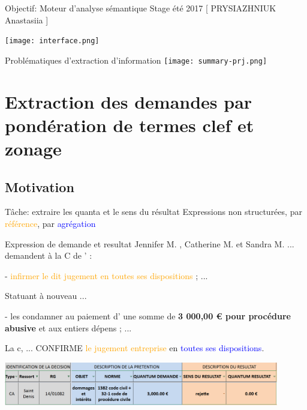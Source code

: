 \documentclass[newPxFont,pagenumber]{beamer}
\begin{document}
\begin{frame}{Objectif: Moteur d'analyse sémantique}
Stage été 2017 [ PRYSIAZHNIUK Anastasiia ]
\begin{center}
\texttt{[image: interface.png]}
\end{center}
\end{frame}


\begin{frame}{Problématiques d'extraction d'information}
\centering\texttt{[image: summary-prj.png]}
\end{frame}


\section{Extraction des demandes par pondération de termes clef et zonage}
\subsection{Motivation}
\begin{frame}{T\^ache: extraire les quanta et le sens du résultat}
\scriptsize
Expressions non structurées, par  \textcolor{orange}{référence}, par \textcolor{blue}{agrégation}
\begin{exampleblock}{Expression de demande et resultat}
\scriptsize
Jennifer M. , Catherine M. et Sandra M. ... demandent à la C de ' :

- \textcolor{orange}{infirmer le dit jugement en toutes ses dispositions} ; ...

Statuant à nouveau ...

- les condamner au paiement d' une somme de  \textbf{3 000,00 € pour procédure abusive} et
aux entiers dépens ; ...

La c, ...  
CONFIRME \textcolor{orange}{le jugement entreprise} en \textcolor{blue}{toutes ses dispositions}.

\end{exampleblock}


\begin{table} 
\centering \includegraphics[width=0.9\textwidth]{tab-danais.png}
\caption{\scriptsize Informations à extraire (Dommages-intérêts pour procédure abusive)}
\end{table}
\end{frame}
\end{document}
